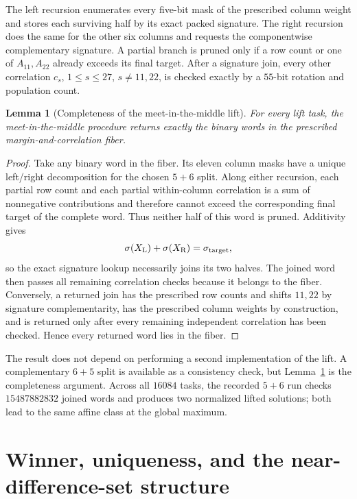\documentclass[11pt,a4paper]{article}
\newtheorem{lemma}[theorem]{Lemma}
\theoremstyle{definition}
\theoremstyle{remark}
\begin{document}
The left recursion enumerates every five-bit mask of the prescribed column
weight and stores each surviving half by its exact packed signature.  The
right recursion does the same for the other six columns and requests the
componentwise complementary signature.  A partial branch is pruned only if a
row count or one of $A_{11},A_{22}$ already exceeds its final target.  After a
signature join, every other correlation $c_s$, $1\le s\le27$,
$s\ne11,22$, is checked exactly by a $55$-bit rotation and population count.

\begin{lemma}[Completeness of the meet-in-the-middle lift]
\label{lem:mitm}
For every lift task, the meet-in-the-middle procedure returns exactly the
binary words in the prescribed margin-and-correlation fiber.
\end{lemma}

\begin{proof}
Take any binary word in the fiber.  Its eleven column masks have a unique
left/right decomposition for the chosen $5+6$ split.  Along either recursion,
each partial row count and each partial within-column correlation is a sum of
nonnegative contributions and therefore cannot exceed the corresponding final
target of the complete word.  Thus neither half of this word is pruned.
Additivity gives
\[
  \sigma(X_{\rm L})+\sigma(X_{\rm R})=\sigma_{\rm target},
\]
so the exact signature lookup necessarily joins its two halves.  The joined
word then passes all remaining correlation checks because it belongs to the
fiber.  Conversely, a returned join has the prescribed row counts and shifts
$11,22$ by signature complementarity, has the prescribed column weights by
construction, and is returned only after every remaining independent
correlation has been checked.  Hence every returned word lies in the fiber.
\end{proof}

The result does not depend on performing a second implementation of the lift.
A complementary $6+5$ split is available as a consistency check, but
Lemma~\ref{lem:mitm} is the completeness argument.  Across all $16084$ tasks,
the recorded $5+6$ run checks $15487882832$ joined words and produces two
normalized lifted solutions; both lead to the same affine class at the global
maximum.

\section{Winner, uniqueness, and the near-difference-set structure}
\label{sec:winner}
\end{document}
